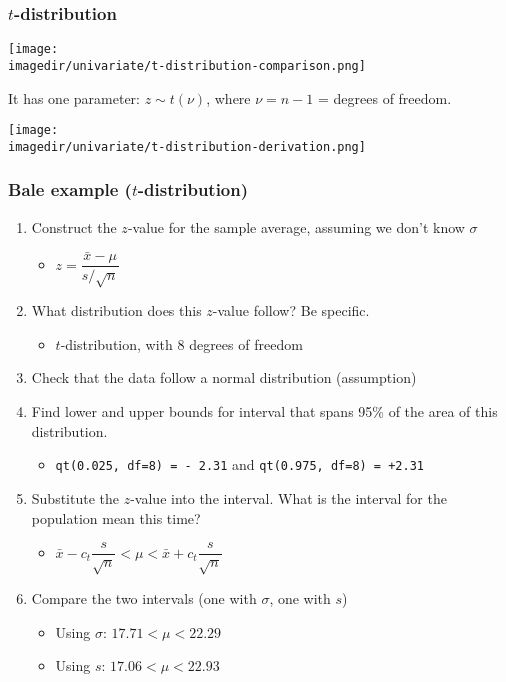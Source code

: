 \begin{frame}\frametitle{$t$-distribution}
	\begin{center}
		\texttt{[image: \\imagedir/univariate/t-distribution-comparison.png]}
	\end{center}
	It has one parameter: $z \sim t\left(\nu\right)$, where $\nu = n-1$ = degrees of freedom.
	\begin{center}
		\texttt{[image: \\imagedir/univariate/t-distribution-derivation.png]}
	\end{center}
\end{frame}

\begin{frame}\frametitle{Bale example ($t$-distribution)}
	\begin{enumerate}
		\item	Construct the $z$-value for the sample average, assuming we don't know $\sigma$ 
		\begin{itemize}
			\item	$z = \dfrac{\bar{x} - \mu}{s/\sqrt{n}}$
		\end{itemize}
		\item	What distribution does this $z$-value follow? Be specific. 
		\begin{itemize}
			\item	$t$-distribution, with 8 degrees of freedom
		\end{itemize}
		\item	Check that the data follow a normal distribution (assumption)
		\item	Find lower and upper bounds for interval that spans 95\% of the area of this distribution. 
		\begin{itemize}
			\item	\texttt{qt(0.025, df=8) = - 2.31} and \texttt{qt(0.975, df=8) = +2.31}
		\end{itemize}
		\item	Substitute the $z$-value into the interval. What is the interval for the population mean this time? 
		\begin{itemize}
			\item	$\bar{x} - c_t\dfrac{s}{\sqrt{n}} < \mu < \bar{x} + c_t\dfrac{s}{\sqrt{n}}$
		\end{itemize}
		\item	Compare the two intervals (one with $\sigma$, one with $s$)
		\begin{itemize}
			\item	Using $\sigma$: $17.71 < \mu < 22.29$
			\item	Using $s$: $17.06 < \mu < 22.93$
		\end{itemize}
	\end{enumerate}
\end{frame}

